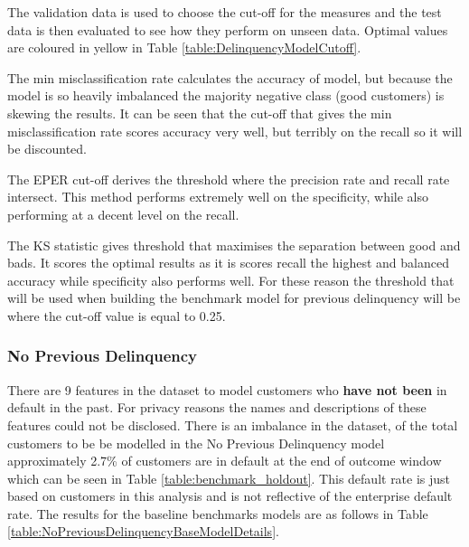 The validation data is used to choose the cut-off for the measures and the test data is then evaluated to see how they perform on unseen data. Optimal values are coloured in yellow in Table \ref{table:DelinquencyModelCutoff}.

The min misclassification rate calculates the accuracy of model, but because the model is so heavily imbalanced the majority negative class (good customers) is skewing the results. It can be seen that the cut-off that gives the min misclassification rate scores accuracy very well, but terribly on the recall so it will be discounted.

The EPER cut-off derives the threshold where the precision rate and recall rate intersect. This method performs extremely well on the specificity, while also performing at a decent level on the recall.

The KS statistic gives threshold that maximises the separation between good and bads. It scores the optimal results as it is scores recall the highest and balanced accuracy while specificity also performs well. For these reason the threshold that will be used when building the benchmark model for previous delinquency will be where the cut-off value is equal to 0.25.


\subsubsection{No Previous Delinquency}

There are 9 features in the dataset to model customers who \textbf{have not been} in default in the past. For privacy reasons the names and descriptions of these features could not be disclosed. There is an imbalance in the dataset, of the total customers to be be modelled in the No Previous Delinquency model approximately 2.7\% of customers are in default at the end of outcome window which can be seen in Table \ref{table:benchmark_holdout}. This default rate is just based on customers in this analysis and is not reflective of the enterprise default rate. The results for the baseline benchmarks models are as follows in Table \ref{table:NoPreviousDelinquencyBaseModelDetails}.

